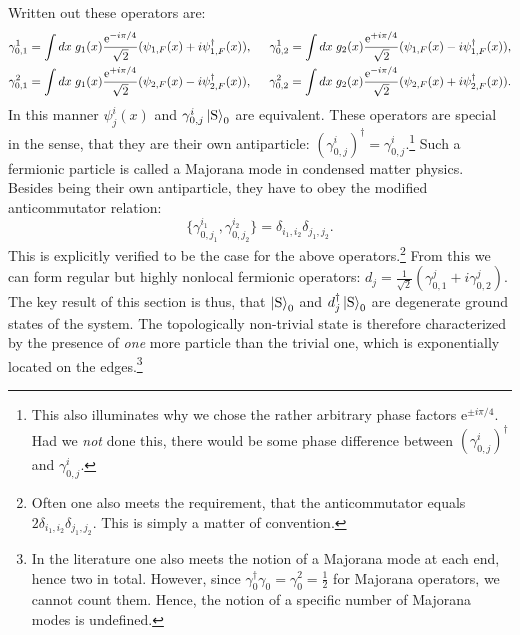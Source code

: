 Written out these operators are: 
\begin{align}
\gamma^1_{0,1} &= \int dx \; g_1(x)\frac{\text{e}^{-i\pi/4}}{\sqrt{2}}(\psi_{1,F}(x) + i\psi^\dagger_{1,F}(x)), \hspace{0.5cm} \gamma^1_{0,2} = \int dx \; g_2(x)\frac{\text{e}^{+i\pi/4}}{\sqrt{2}}(\psi_{1,F}(x) - i\psi^\dagger_{1,F}(x)), \nonumber \\
\gamma^2_{0,1} &= \int dx \; g_1(x)\frac{\text{e}^{+i\pi/4}}{\sqrt{2}}(\psi_{2,F}(x) - i\psi^\dagger_{2,F}(x)), \hspace{0.5cm} \gamma^2_{0,2} = \int dx \; g_2(x)\frac{\text{e}^{-i\pi/4}}{\sqrt{2}}(\psi_{2,F}(x) + i \psi^\dagger_{2,F}(x)). \nonumber 
\end{align}
In this manner $\psi^{i}_{j}(x)$ and $\gamma^{i}_{0,j}\ket{\text{S}}_0$ are equivalent. These operators are special in the sense, that they are their own antiparticle: $\left(\gamma^{i}_{0,j}\right)^\dagger = \gamma^{i}_{0,j}$.\footnote{This also illuminates why we chose the rather arbitrary phase factors $\text{e}^{\pm i\pi/4}$. Had we \textit{not} done this, there would be some phase difference between $\left(\gamma^{i}_{0,j}\right)^\dagger$ and $\gamma^{i}_{0,j}$.} Such a fermionic particle is called a Majorana mode in condensed matter physics. Besides being their own antiparticle, they have to obey the modified anticommutator relation:
\begin{equation}
\{\gamma^{i_1}_{0,j_1}, \gamma^{i_2}_{0,j_2} \} = \delta_{i_1,i_2}\delta_{j_1,j_2}. \nonumber
\end{equation}
This is explicitly verified to be the case for the above operators.\footnote{Often one also meets the requirement, that the anticommutator equals $2\delta_{i_1,i_2}\delta_{j_1,j_2}$. This is simply a matter of convention.} From this we can form regular but highly nonlocal fermionic operators: $d_j = \frac{1}{\sqrt{2}}(\gamma^{j}_{0,1} + i\gamma^{j}_{0,2})$. The key result of this section is thus, that $\ket{\text{S}}_0$ and $d_j^\dagger\ket{\text{S}}_0$ are degenerate ground states of the system. The topologically non-trivial state is therefore characterized by the presence of \textit{one} more particle than the trivial one, which is exponentially located on the edges.\footnote{In the literature one also meets the notion of a Majorana mode at each end, hence two in total. However, since $\gamma^\dagger_0\gamma_0 = \gamma_0^2 = \frac{1}{2}$ for Majorana operators, we cannot count them. Hence, the notion of a specific number of Majorana modes is undefined.}


